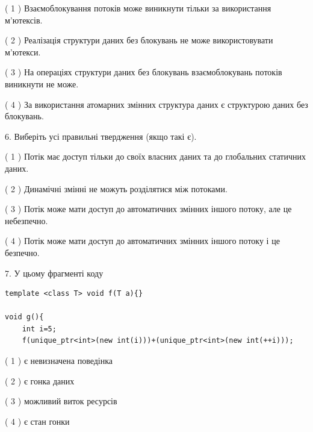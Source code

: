 \documentclass[12pt, ukrainian]{article}
\begin{document}
\begin {large}
{( 1 ) Взаємоблокування потоків може виникнути тільки за використання м’ютексів.%

( 2 ) Реалізація структури даних без блокувань не може використовувати м’ютекси.%

( 3 ) На операціях структури даних без блокувань взаємоблокувань потоків виникнути не може.%

( 4 ) За використання атомарних змінних структура даних є структурою даних без блокувань.%
\newpage



\vspace{5mm}
6. Виберіть усі правильні твердження (якщо такі є).\par
\vspace{2mm}

( 1 ) Потік має доступ тільки до своїх власних даних та до глобальних статичних даних.%

( 2 ) Динамічні змінні не можуть розділятися між потоками.%

( 3 ) Потік може мати доступ до автоматичних змінних іншого потоку, але це небезпечно.%

( 4 ) Потік може мати доступ до автоматичних змінних іншого потоку і це безпечно.%


\vspace{5mm}
7. У цьому фрагменті коду
\begin{verbatim}
template <class T> void f(T a){}

void g(){
    int i=5;
    f(unique_ptr<int>(new int(i)))+(unique_ptr<int>(new int(++i)));
\end{verbatim}
( 1 ) є невизначена поведінка%

( 2 ) є гонка даних%

( 3 ) можливий виток ресурсів%

( 4 ) є стан гонки%
}
\end {large}
\end{document}
